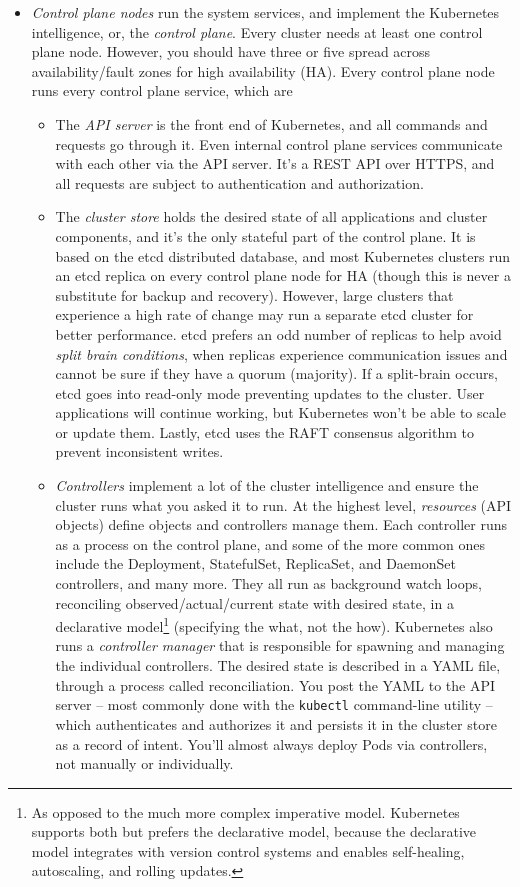 \documentclass[table, xcdraw]{article}%
\begin{document}
\begin{itemize}
\begin{itemize}
		\item \emph{Control plane nodes} run the system services, and implement the Kubernetes intelligence, or, the \emph{control plane}. Every cluster needs at least one control plane node. However, you should have three or five spread across availability/fault zones for high availability (HA). Every control plane node runs every control plane service, which are
	
		\begin{itemize}
			\item The \emph{API server} is the front end of Kubernetes, and all commands and requests go through it. Even internal control plane services communicate with each other via the API server. It's a REST API over HTTPS, and all requests are subject to authentication and authorization.
			\item The \emph{cluster store} holds the desired state of all applications and cluster components, and it’s the only stateful part of the control plane. It is based on the etcd distributed database, and most Kubernetes clusters run an etcd replica on every control plane node for HA (though this is never a substitute for backup and recovery). However, large clusters that experience a high rate of change may run a separate etcd cluster for better performance. etcd prefers an odd number of replicas to help avoid \emph{split brain conditions}, when replicas experience communication issues and cannot be sure if they have a quorum (majority). If a split-brain occurs, etcd goes into read-only mode preventing updates to the cluster. User applications will continue working, but Kubernetes won’t be able to scale or update them. Lastly, etcd uses the RAFT consensus algorithm to prevent inconsistent writes.
			\item \emph{Controllers} implement a lot of the cluster intelligence and ensure the cluster runs what you asked it to run. At the highest level, \emph{resources} (API objects) define objects and controllers manage them. Each controller runs as a process on the control plane, and some of the more common ones include the Deployment, StatefulSet, ReplicaSet, and DaemonSet controllers, and many more. They all run as background watch loops, reconciling observed/actual/current state with desired state, in a declarative model\footnote{As opposed to the much more complex imperative model. Kubernetes supports both but prefers the declarative model, because the declarative model integrates with version control systems and enables self-healing, autoscaling, and rolling updates.} (specifying the what, not the how). Kubernetes also runs a \emph{controller manager} that is responsible for spawning and managing the individual controllers. The desired state is described in a YAML file, through a process called reconciliation. You post the YAML to the API server -- most commonly done with the \texttt{kubectl} command-line utility -- which authenticates and authorizes it and persists it in the cluster store as a record of intent. You’ll almost always deploy Pods via controllers, not manually or individually.

\end{itemize}
\end{itemize}
\end{itemize}
\end{document}
